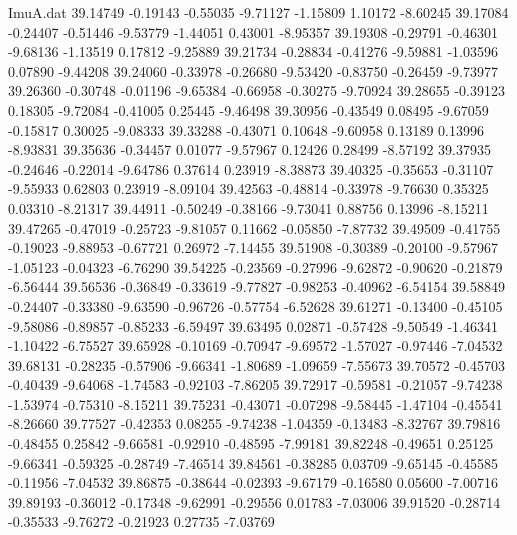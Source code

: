 \begin{filecontents}{ImuA.dat}
  39.14749   -0.19143   -0.55035   -9.71127   -1.15809    1.10172   -8.60245
  39.17084   -0.24407   -0.51446   -9.53779   -1.44051    0.43001   -8.95357
  39.19308   -0.29791   -0.46301   -9.68136   -1.13519    0.17812   -9.25889
  39.21734   -0.28834   -0.41276   -9.59881   -1.03596    0.07890   -9.44208
  39.24060   -0.33978   -0.26680   -9.53420   -0.83750   -0.26459   -9.73977
  39.26360   -0.30748   -0.01196   -9.65384   -0.66958   -0.30275   -9.70924
  39.28655   -0.39123    0.18305   -9.72084   -0.41005    0.25445   -9.46498
  39.30956   -0.43549    0.08495   -9.67059   -0.15817    0.30025   -9.08333
  39.33288   -0.43071    0.10648   -9.60958    0.13189    0.13996   -8.93831
  39.35636   -0.34457    0.01077   -9.57967    0.12426    0.28499   -8.57192
  39.37935   -0.24646   -0.22014   -9.64786    0.37614    0.23919   -8.38873
  39.40325   -0.35653   -0.31107   -9.55933    0.62803    0.23919   -8.09104
  39.42563   -0.48814   -0.33978   -9.76630    0.35325    0.03310   -8.21317
  39.44911   -0.50249   -0.38166   -9.73041    0.88756    0.13996   -8.15211
  39.47265   -0.47019   -0.25723   -9.81057    0.11662   -0.05850   -7.87732
  39.49509   -0.41755   -0.19023   -9.88953   -0.67721    0.26972   -7.14455
  39.51908   -0.30389   -0.20100   -9.57967   -1.05123   -0.04323   -6.76290
  39.54225   -0.23569   -0.27996   -9.62872   -0.90620   -0.21879   -6.56444
  39.56536   -0.36849   -0.33619   -9.77827   -0.98253   -0.40962   -6.54154
  39.58849   -0.24407   -0.33380   -9.63590   -0.96726   -0.57754   -6.52628
  39.61271   -0.13400   -0.45105   -9.58086   -0.89857   -0.85233   -6.59497
  39.63495    0.02871   -0.57428   -9.50549   -1.46341   -1.10422   -6.75527
  39.65928   -0.10169   -0.70947   -9.69572   -1.57027   -0.97446   -7.04532
  39.68131   -0.28235   -0.57906   -9.66341   -1.80689   -1.09659   -7.55673
  39.70572   -0.45703   -0.40439   -9.64068   -1.74583   -0.92103   -7.86205
  39.72917   -0.59581   -0.21057   -9.74238   -1.53974   -0.75310   -8.15211
  39.75231   -0.43071   -0.07298   -9.58445   -1.47104   -0.45541   -8.26660
  39.77527   -0.42353    0.08255   -9.74238   -1.04359   -0.13483   -8.32767
  39.79816   -0.48455    0.25842   -9.66581   -0.92910   -0.48595   -7.99181
  39.82248   -0.49651    0.25125   -9.66341   -0.59325   -0.28749   -7.46514
  39.84561   -0.38285    0.03709   -9.65145   -0.45585   -0.11956   -7.04532
  39.86875   -0.38644   -0.02393   -9.67179   -0.16580    0.05600   -7.00716
  39.89193   -0.36012   -0.17348   -9.62991   -0.29556    0.01783   -7.03006
  39.91520   -0.28714   -0.35533   -9.76272   -0.21923    0.27735   -7.03769

\end{filecontents}
